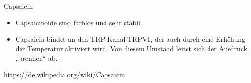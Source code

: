 
\begin{frame}[t]{Capsaicin}
  
       \begin{itemize}
         \item Capsaicinoide sind farblos und sehr stabil. 
         \item Capsaicin bindet an den TRP-Kanal TRPV1, der auch durch eine Erhöhung der Temperatur aktiviert wird. Von diesem Umstand leitet sich der Ausdruck „brennen“ ab.
       \end{itemize}
       \url{https://de.wikipedia.org/wiki/Capsaicin}
\end{frame}
